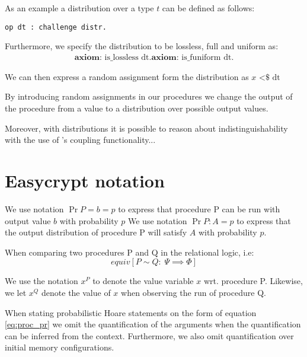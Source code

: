 As an example a distribution over a type $t$ can be defined as follows:
\begin{lstlisting}[frame=none]
op dt : challenge distr.
\end{lstlisting}
Furthermore, we specify the distribution to be lossless, full and uniform as:
\begin{gather*}
  \textbf{axiom: } \text{is\_lossless dt}.
  \textbf{axiom: } \text{is\_funiform dt}.
\end{gather*}

We can then express a random assignment form the distribution as $x \text{ <\$} \text{ dt}$


By introducing random assignments in our procedures we change
the output of the procedure from a value to a distribution over possible output values.

Moreover, with distributions it is possible to reason about indistinguishability
with the use of \easycrypt's coupling functionality...

\section{Easycrypt notation}
\label{sec:label}

We use notation $\Pr{P = b} = p$ to express that procedure P can be run with
output value $b$ with probability $p$
We use notation $\Pr{P : A} = p$ to express that the output distribution of
procedure P will satisfy $A$ with probability $p$.

When comparing two procedures P and Q in the relational logic, i.e:
\[
  equiv[P \sim Q :\; \Psi \implies \Phi]
\]


We use the notation $x^{P}$ to denote the value variable $x$ wrt. procedure P.
Likewise, we let $x^{Q}$ denote the value of $x$ when observing the run of
procedure Q.

When stating probabilistic Hoare statements on the form of equation
\ref{eq:proc_pr} we omit the quantification of the arguments when the
quantification can be inferred from the context. Furthermore, we also omit
quantification over initial memory configurations.

